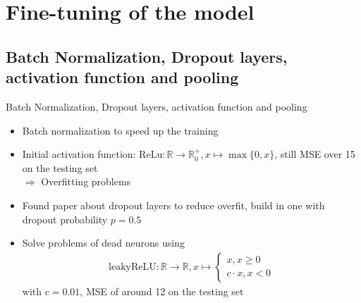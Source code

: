 \section{Fine-tuning of the model}
\subsection{Batch Normalization, Dropout layers, activation function and pooling}

\begin{frame}{Batch Normalization, Dropout layers, activation function and pooling}
\begin{itemize}
\item Batch normalization to speed up the training \cite{BatchNorm2015}
\item Initial activation function: $\mathrm{ReLu}: \mathbb{R} \to \mathbb{R}_0^+, x \mapsto \max\{0,x\}$, still MSE over 15 on the testing set\\
$\Rightarrow$ Overfitting problems
\item Found paper about dropout layers \cite{Dropout2014} to reduce overfit, build in one with dropout probability $p=0.5$
\item Solve problems of dead neurons using
\begin{align*}
\mathrm{leakyReLU} : \mathbb{R} \to \mathbb{R}, x \mapsto \begin{cases}
x, x \geq 0\\
c \cdot x, x <0
\end{cases}
\end{align*}
with $c = 0.01$, MSE of around 12 on the testing set
\end{itemize}
\end{frame}
